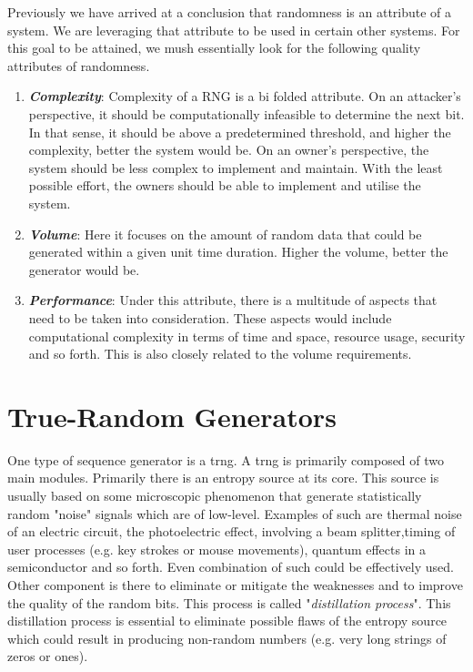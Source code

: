 Previously we have arrived at a conclusion that randomness is an attribute of a system. We are leveraging that attribute to be used in certain other systems. For this goal to be attained, we mush essentially look for the following quality attributes of randomness. 
\begin{enumerate}
    \item \textbf{\textit{Complexity}}: Complexity of a RNG is a bi folded attribute. On an attacker's perspective, it should be computationally infeasible to determine the next bit. In that sense, it should be above a predetermined threshold, and higher the complexity, better the system would be. On an owner's perspective, the system should be less complex to implement and maintain. With the least possible effort, the owners should be able to implement and utilise the system.
    
    \item \textbf{\textit{Volume}}: Here it focuses on the amount of random data that could be generated within a given unit time duration. Higher the volume, better the generator would be.
    
    \item \textbf{\textit{Performance}}: Under this attribute, there is a multitude of aspects that need to be taken into consideration. These aspects would include computational complexity in terms of time and space, resource usage, security and so forth. This is also closely related to the volume requirements.
\end{enumerate}

\section{True-Random Generators}

One type of sequence generator is a \acrfull{trng}. A \acrshort{trng} is primarily composed of two main modules. Primarily there is an entropy source at its core. This source is usually based on some microscopic phenomenon that generate statistically random "noise" signals which are of low-level. Examples of such are thermal noise of an electric circuit, the photoelectric effect, involving a beam splitter,timing of user processes (e.g. key strokes or mouse movements), quantum effects in a semiconductor and so forth. Even combination of such could be effectively used. Other component is there to eliminate or mitigate the weaknesses and to improve the quality of the random bits. This process is called "\textit{distillation process}". This distillation process is essential to eliminate possible flaws of the entropy source which could result in producing non-random numbers (e.g. very long strings of zeros or ones).

